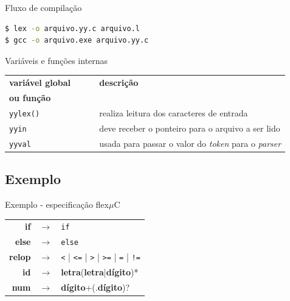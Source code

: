\begin{frame}[fragile]{Fluxo de compilação}
\begin{lstlisting}[language=bash]
$ lex -o arquivo.yy.c arquivo.l
$ gcc -o arquivo.exe arquivo.yy.c
\end{lstlisting}\bigskip

\pause Variáveis e funções internas

 \center\small
 \begin{tabular}{ll}
   \toprule
   \bf variável global $\qquad$&  \bf descrição\\
   \bf ou função   & \\
   \midrule
   {\tt yylex()}  &  realiza leitura dos caracteres de entrada        \\
   {\tt yyin}     &  deve receber o ponteiro para o arquivo a ser lido \\
   {\tt yyval}    & usada para passar o valor do {\it token\/} para o {\it parser\/}\\
   \bottomrule
 \end{tabular}
\end{frame}

\subsection{Exemplo}
\frame{\tableofcontents[currentsubsection]}

\begin{frame}{Exemplo - especificação flex}{$\mu$C}
  \center
  \begin{tabular}{rrl}
    {\bf if} & $\rightarrow$ & {\tt if} \\
    {\bf else} & $\rightarrow$ & {\tt else} \\
    {\bf relop} & $\rightarrow$ & {\tt <} | {\tt <=} | {\tt >} | {\tt >=} | {\tt =} | {\tt !=} \\
    {\bf id}    & $\rightarrow$ & {\bf letra}({\bf letra}|{\bf dígito})* \\
    {\bf num}    & $\rightarrow$ & {\bf dígito}+(.{\bf dígito})? \\
   \end{tabular}
 \end{frame}

